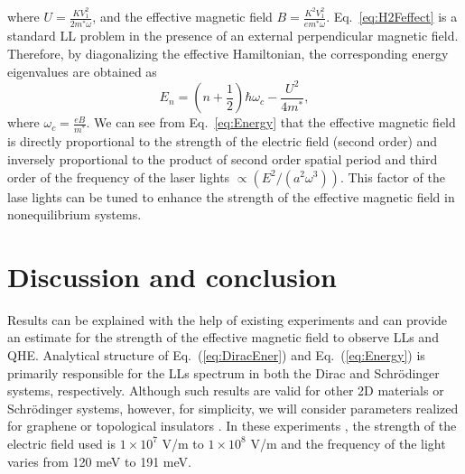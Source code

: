 \documentclass[aps,prl,showpacs,twocolumn,amsmath,amssymb,superscriptaddress]{revtex4-2}
\begin{document}
where $U=\frac{KV_{1}^{2}}{2m^{\ast}\omega}$, and the effective magnetic field
$B=\frac{K^{2}V_{1}^{2}}{em^{\ast}\omega}$. Eq.~\eqref{eq:H2Feffect} is a standard LL problem in the presence of an external perpendicular
magnetic field. Therefore, by diagonalizing the effective Hamiltonian, the corresponding energy eigenvalues are obtained as%
\begin{equation} \label{eq:Energy}
E_{n}=(n+\frac{1}{2})\hbar\omega_{c}-\frac{U^{2}}{4m^{\ast}},
\end{equation}
where $\omega_{c}=\frac{eB}{m^{\ast}}$. We can see from Eq.~\eqref{eq:Energy} that the effective magnetic field is directly proportional to the strength of the electric field (second order) and inversely proportional to the product of second order spatial period and third order of the frequency of the laser lights $\propto (E^2/(a^2\omega^3))$. This factor of the lase lights can be tuned to enhance the strength of the effective magnetic field in nonequilibrium systems.

\section{Discussion and conclusion}

Results can be explained with the help of existing experiments \cite{YHW, JWM} and can provide an estimate for the strength of the effective magnetic field to observe LLs and QHE. Analytical structure of Eq.~(\ref{eq:DiracEner}) and Eq.~(\ref{eq:Energy}) is primarily responsible for the LLs spectrum in both the Dirac and Schr\"{o}dinger systems, respectively.
Although such results are valid for other 2D materials or Schr\"{o}dinger systems, however, for simplicity, we will consider parameters realized for graphene or topological insulators \cite{YHW, JWM}. In these experiments \cite{YHW, JWM}, the strength of the electric field used is $1 \times 10^7$ V/m to $1 \times 10^8$ V/m and the frequency of the light varies from 120 meV to 191 meV.
\end{document}
